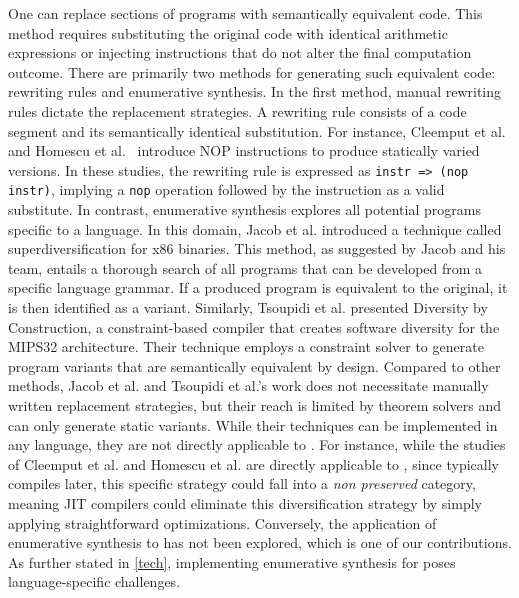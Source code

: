 One can replace sections of programs with semantically equivalent code. 
This method requires substituting the original code with identical arithmetic expressions or injecting instructions that do not alter the final computation outcome. 
There are primarily two methods for generating such equivalent code: rewriting rules and enumerative synthesis. 
In the first method, manual rewriting rules dictate the replacement strategies. 
A rewriting rule consists of a code segment and its semantically identical substitution. 
For instance, Cleemput et al. \cite{Cleemput2012} and Homescu et al.~\cite{homescu2013profile} introduce NOP instructions to produce statically varied versions. 
In these studies, the rewriting rule is expressed as \texttt{instr => (nop instr)}, implying a \texttt{nop} operation followed by the instruction as a valid substitute.
In contrast, enumerative synthesis explores all potential programs specific to a language. 
In this domain, Jacob et al. \cite{jacob2008superdiversifier} introduced a technique called superdiversification for x86 binaries. 
This method, as suggested by Jacob and his team, entails a thorough search of all programs that can be developed from a specific language grammar. 
If a produced program is equivalent to the original, it is then identified as a variant. 
Similarly, Tsoupidi et al. \cite{Tsoupidi2020ConstraintBasedSD} presented Diversity by Construction, a constraint-based compiler that creates software diversity for the MIPS32 architecture.  
Their technique employs a constraint solver to generate program variants that are semantically equivalent by design.
Compared to other methods, Jacob et al. and Tsoupidi et al.'s work does not necessitate manually written replacement strategies, but their reach is limited by theorem solvers and can only generate static variants. 
While their techniques can be implemented in any language, they are not directly applicable to \Wasm.
For instance, while the studies of Cleemput et al. and Homescu et al. are directly applicable to \Wasm, since \Wasm typically compiles later, this specific strategy could fall into a \emph{non preserved} category, meaning JIT compilers could eliminate this diversification strategy by simply applying straightforward optimizations.
Conversely, the application of enumerative synthesis to \Wasm has not been explored, which is one of our contributions. 
As further stated in \autoref{tech}, implementing enumerative synthesis for \Wasm poses language-specific challenges.


